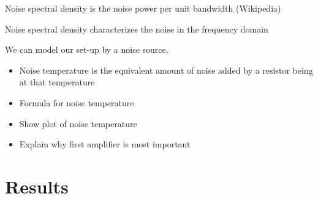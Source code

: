 \documentclass[12pt]{report}
\begin{document}
Noise spectral density is the noise power per unit bandwidth (Wikipedia)

Noise spectral density characterizes the noise in the frequency domain


We can model our set-up by a noise source,

\begin{itemize}
    \item Noise temperature is the equivalent amount of noise added by a resistor being at that temperature
    \item Formula for noise temperature
    \item Show plot of noise temperature
    \item Explain why first amplifier is most important
\end{itemize}



\section{Results}
\label{sec:noise_results}








\end{document}
